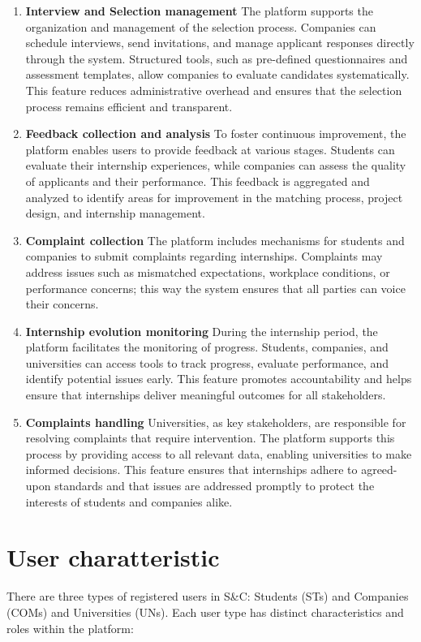 \begin{enumerate}
\item \textbf{Interview and Selection management}
The platform supports the organization and management of the selection process. Companies can schedule interviews, send invitations, and manage applicant responses directly through the system. Structured tools, such as pre-defined questionnaires and assessment templates, allow companies to evaluate candidates systematically. This feature reduces administrative overhead and ensures that the selection process remains efficient and transparent.
\item \textbf{Feedback collection and analysis}
To foster continuous improvement, the platform enables users to provide feedback at various stages. Students can evaluate their internship experiences, while companies can assess the quality of applicants and their performance. This feedback is aggregated and analyzed to identify areas for improvement in the matching process, project design, and internship management.
\item \textbf{Complaint collection}
The platform includes mechanisms for students and companies to submit complaints regarding internships. Complaints may address issues such as mismatched expectations, workplace conditions, or performance concerns; this way the system ensures that all parties can voice their concerns.
\item \textbf{Internship evolution monitoring}
During the internship period, the platform facilitates the monitoring of progress. Students, companies, and universities can access tools to track progress, evaluate performance, and identify potential issues early. This feature promotes accountability and helps ensure that internships deliver meaningful outcomes for all stakeholders.
\item \textbf{Complaints handling}
Universities, as key stakeholders, are responsible for resolving complaints that require intervention. The platform supports this process by providing access to all relevant data, enabling universities to make informed decisions. This feature ensures that internships adhere to agreed-upon standards and that issues are addressed promptly to protect the interests of students and companies alike.
\end{enumerate}

\pagebreak
\section{User charatteristic}

There are three types of registered users in S\&C: Students (STs) and Companies (COMs) and Universities (UNs). Each user type has distinct characteristics and roles within the platform:

